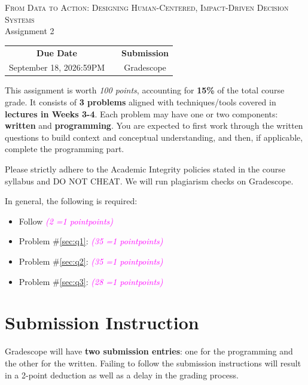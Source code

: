\documentclass[11pt, letter, answers]{exam}
\newcommand{\grade}[1]{
    \small\textcolor{magenta}{\emph{(#1 \ifnum#1=1 point\else points\fi)}}%
    \normalsize
}
\begin{document}
\begin{center}
{\Large \textsc{From Data to Action: Designing Human-Centered, Impact-Driven Decision Systems}} \\
[0.5em]
{\Large Assignment 2}
\end{center}

\begin{center}
\begin{tabular}{ccc}
\hline
\textbf{Due Date} & & \textbf{Submission} \\
September 18, 2026\quad 11:59PM & & Gradescope \\
\hline
\end{tabular}
\end{center}

\vspace{1em}
This assignment is worth \textit{\color{magenta}\textit{100 points}}, accounting for \textbf{15\%} of the total course grade. It consists of \textbf{3 problems} aligned with techniques/tools covered in \textbf{lectures in Weeks 3-4}. Each problem may have one or two components: \textbf{written} and \textbf{programming}. You are expected to first work through the written questions to build context and conceptual understanding, and then, if applicable, complete the programming part. 

Please strictly adhere to the Academic Integrity policies stated in the course syllabus and DO NOT CHEAT. We will run plagiarism checks on Gradescope.

In general, the following is required:
\begin{itemize}
    \item Follow  \grade{2}
    \item Problem \#\ref{sec:q1}:  \grade{35}
    \item Problem \#\ref{sec:q2}:  \grade{35}
    \item Problem \#\ref{sec:q3}:  \grade{28}
\end{itemize}


\section*{Submission Instruction}
\label{sec:a1_submission}

Gradescope will have \textbf{two submission entries}: one for the programming and the other for the written. Failing to follow the submission instructions will result in a 2-point deduction as well as a delay in the grading process.
\end{document}
